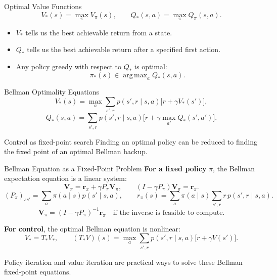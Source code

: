\documentclass[aspectratio=169]{beamer}
\DeclareMathOperator*{\argmax}{arg\,max}
\begin{document}
\begin{frame}{Optimal Value Functions}
\small
\[
V_*(s)=\max_\pi V_\pi(s),
\qquad
Q_*(s,a)=\max_\pi Q_\pi(s,a).
\]

\vspace{0.6em}
\begin{itemize}
    \item $V_*$ tells us the best achievable return from a state.
    \item $Q_*$ tells us the best achievable return after a specified first action.
    \item Any policy greedy with respect to $Q_*$ is optimal:
    \[
    \pi_*(s)\in\argmax_a Q_*(s,a).
    \]
\end{itemize}
\end{frame}

\begin{frame}{Bellman Optimality Equations}
\small
\[
V_*(s)=
\max_a \sum_{s',r}p(s',r\mid s,a)
\bigl[r+\gamma V_*(s')\bigr],
\]
\[
Q_*(s,a)=
\sum_{s',r}p(s',r\mid s,a)
\bigl[r+\gamma\max_{a'}Q_*(s',a')\bigr].
\]

\vspace{0.6em}
\begin{block}{Control as fixed-point search}
Finding an optimal policy can be reduced to finding the fixed point of an optimal Bellman backup.
\end{block}
\end{frame}

\begin{frame}{Bellman Equation as a Fixed-Point Problem}
\small
\textbf{For a fixed policy} $\pi$, the Bellman expectation equation is a linear system:
\[
\mathbf{V}_\pi=\mathbf{r}_\pi+\gamma P_\pi \mathbf{V}_\pi,
\qquad
(I-\gamma P_\pi)\mathbf{V}_\pi=\mathbf{r}_\pi.
\]
\[
(P_\pi)_{ss'}=\sum_a\pi(a\mid s)p(s'\mid s,a),
\qquad
r_\pi(s)=\sum_a\pi(a\mid s)\sum_{s',r}r\,p(s',r\mid s,a).
\]
\[
\mathbf{V}_\pi=(I-\gamma P_\pi)^{-1}\mathbf{r}_\pi
\quad \text{if the inverse is feasible to compute.}
\]

\vspace{0.6em}
\textbf{For control}, the optimal Bellman equation is nonlinear:
\[
V_* = T_* V_*,
\qquad
(T_*V)(s)=\max_a\sum_{s',r}p(s',r\mid s,a)\bigl[r+\gamma V(s')\bigr].
\]

\vspace{0.4em}
Policy iteration and value iteration are practical ways to solve these Bellman fixed-point equations.
\end{frame}
\end{document}
